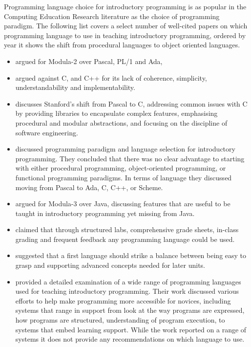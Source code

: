 Programming language choice for introductory programming is as popular in the Computing Education Research literature as the choice of programming paradigm. The following list covers a select number of well-cited papers on which programming language to use in teaching introductory programming, ordered by year it shows the shift from procedural languages to object oriented languages.

%
%



\begin{itemize}[noitemsep,nolistsep]
	\item \citet{Koffman:1988} argued for Modula-2 over Pascal, PL/1 and Ada, 
	\item \citet{Mody:1991} argued against C, and C++ for its lack of coherence, simplicity, understandability and implementability. 

	\item \citet{Roberts:1993} discusses Stanford's shift from Pascal to C, addressing common issues with C by providing libraries to encapsulate complex features, emphasising procedural and modular abstractions, and focusing on the discipline of software engineering.

	\item \citet{Brilliant:1996} discussed programming paradigm and language selection for introductory programming. They concluded that there was no clear advantage to starting with either procedural programming, object-oriented programming, or functional programming paradigms. In terms of language they discussed moving from Pascal to Ada, C, C++, or Scheme.

	\item \citet{Boszormenyi:1998} argued for Modula-3 over Java, discussing features that are useful to be taught in introductory programming yet missing from Java.

	\item \citet{Howell:2003} claimed that through structured labs, comprehensive grade sheets, in-class grading and frequent feedback any programming language could be used.

	\item \citet{Gupta:2004} suggested that a first language should strike a balance between being easy to grasp and supporting advanced concepts needed for later units.

	\item \citet{Kelleher:2005} provided a detailed examination of a wide range of programming languages used for teaching introductory programming. Their work discussed various efforts to help make programming more accessible for novices, including systems that range in support from look at the way programs are expressed, how programs are structured, understanding of program execution, to systems that embed learning support. While the work reported on a range of systems it does not provide any recommendations on which language to use.


\end{itemize}
